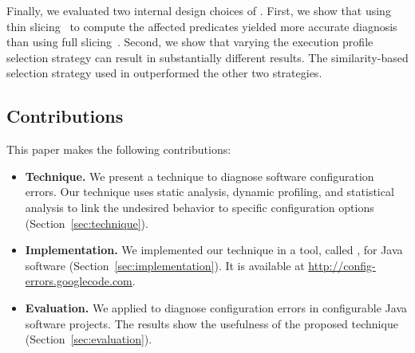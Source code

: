 Finally, we evaluated two internal design choices of \ourtool.
First, we show that using thin slicing~\cite{Sridharan:2007} to compute the affected
predicates yielded more accurate diagnosis than using full slicing~\cite{Horwitz:1988}.
Second, we %
show that varying the execution
profile selection strategy can result in substantially different
results. %
The similarity-based selection strategy used in \ourtool outperformed
the other two strategies.








\subsection{Contributions}
This paper makes the following contributions:

\begin{itemize}

\item \textbf{Technique.} We present a technique to diagnose
software configuration errors. Our technique uses static analysis,
dynamic profiling, and statistical analysis to link the
undesired behavior to specific configuration options (Section~\ref{sec:technique}).


\item \textbf{Implementation.} We implemented our technique 
in a tool, called \ourtool, for Java software (Section~\ref{sec:implementation}). It is available at
\url{http://config-errors.googlecode.com}. 


\item \textbf{Evaluation.} We applied \ourtool to diagnose
\errors configuration errors in \subjectnum
configurable Java software projects. The results
show the usefulness of the proposed technique (Section~\ref{sec:evaluation}).

\end{itemize}




